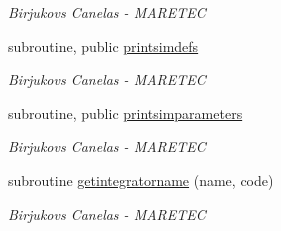\begin{DoxyCompactItemize}
\begin{DoxyCompactList}\small\item\em Birjukovs Canelas -\/ M\+A\+R\+E\+T\+EC \end{DoxyCompactList}\item 
subroutine, public \mbox{\hyperlink{namespacesimulation__globals_a1683e8f5cab2101e7e3dbc91108b64a3}{printsimdefs}}
\begin{DoxyCompactList}\small\item\em Birjukovs Canelas -\/ M\+A\+R\+E\+T\+EC \end{DoxyCompactList}\item 
subroutine, public \mbox{\hyperlink{namespacesimulation__globals_a1e5d10f7d7954c9d5346294c72a738c1}{printsimparameters}}
\begin{DoxyCompactList}\small\item\em Birjukovs Canelas -\/ M\+A\+R\+E\+T\+EC \end{DoxyCompactList}\item 
subroutine \mbox{\hyperlink{namespacesimulation__globals_a2c6bf88542c503d1da58280ab3dcf772}{getintegratorname}} (name, code)
\begin{DoxyCompactList}\small\item\em Birjukovs Canelas -\/ M\+A\+R\+E\+T\+EC \end{DoxyCompactList}\end{DoxyCompactItemize}
